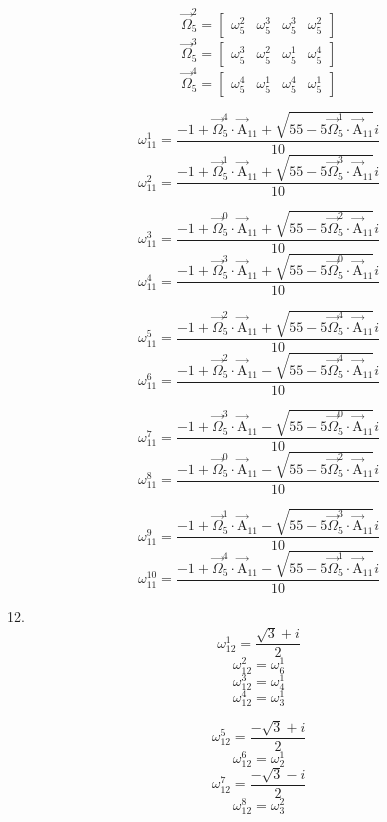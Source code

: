 \documentclass{article}
\begin{document}
\[ \vec{\Omega}_{5}^{2}=\left[ \begin{matrix} \omega_{5}^{2} & \omega_{5}^{3} & \omega_{5}^{3} & \omega_{5}^{2} \end{matrix} \right] \]
\[ \vec{\Omega}_{5}^{3}=\left[ \begin{matrix} \omega_{5}^{3} & \omega_{5}^{2} & \omega_{5}^{1} & \omega_{5}^{4} \end{matrix} \right] \]
\[ \vec{\Omega}_{5}^{4}=\left[ \begin{matrix} \omega_{5}^{4} & \omega_{5}^{1} & \omega_{5}^{4} & \omega_{5}^{1} \end{matrix} \right] \]

\[ \omega_{11}^{1}=\frac{-1+\vec{\Omega}_{5}^{4}\cdot\vec{\mathrm{A}}_{11}+\sqrt{55-5\vec{\Omega}_{5}^{1}\cdot\vec{\mathrm{A}}_{11}}i}{10} \]
\[ \omega_{11}^{2}=\frac{-1+\vec{\Omega}_{5}^{1}\cdot\vec{\mathrm{A}}_{11}+\sqrt{55-5\vec{\Omega}_{5}^{3}\cdot\vec{\mathrm{A}}_{11}}i}{10} \]

\[ \omega_{11}^{3}=\frac{-1+\vec{\Omega}_{5}^{0}\cdot\vec{\mathrm{A}}_{11}+\sqrt{55-5\vec{\Omega}_{5}^{2}\cdot\vec{\mathrm{A}}_{11}}i}{10} \]
\[ \omega_{11}^{4}=\frac{-1+\vec{\Omega}_{5}^{3}\cdot\vec{\mathrm{A}}_{11}+\sqrt{55-5\vec{\Omega}_{5}^{0}\cdot\vec{\mathrm{A}}_{11}}i}{10} \]

\[ \omega_{11}^{5}=\frac{-1+\vec{\Omega}_{5}^{2}\cdot\vec{\mathrm{A}}_{11}+\sqrt{55-5\vec{\Omega}_{5}^{4}\cdot\vec{\mathrm{A}}_{11}}i}{10} \]
\[ \omega_{11}^{6}=\frac{-1+\vec{\Omega}_{5}^{2}\cdot\vec{\mathrm{A}}_{11}-\sqrt{55-5\vec{\Omega}_{5}^{4}\cdot\vec{\mathrm{A}}_{11}}i}{10} \]

\[ \omega_{11}^{7}=\frac{-1+\vec{\Omega}_{5}^{3}\cdot\vec{\mathrm{A}}_{11}-\sqrt{55-5\vec{\Omega}_{5}^{0}\cdot\vec{\mathrm{A}}_{11}}i}{10} \]
\[ \omega_{11}^{8}=\frac{-1+\vec{\Omega}_{5}^{0}\cdot\vec{\mathrm{A}}_{11}-\sqrt{55-5\vec{\Omega}_{5}^{2}\cdot\vec{\mathrm{A}}_{11}}i}{10} \]

\[ \omega_{11}^{9}=\frac{-1+\vec{\Omega}_{5}^{1}\cdot\vec{\mathrm{A}}_{11}-\sqrt{55-5\vec{\Omega}_{5}^{3}\cdot\vec{\mathrm{A}}_{11}}i}{10} \]
\[ \omega_{11}^{10}=\frac{-1+\vec{\Omega}_{5}^{4}\cdot\vec{\mathrm{A}}_{11}-\sqrt{55-5\vec{\Omega}_{5}^{1}\cdot\vec{\mathrm{A}}_{11}}i}{10} \]

12.
\[ \omega_{12}^{1}=\frac{\sqrt{3}+i}{2} \]
\[ \omega_{12}^{2}=\omega_{6}^{1} \]
\[ \omega_{12}^{3}=\omega_{4}^{1} \]
\[ \omega_{12}^{4}=\omega_{3}^{1} \]

\[ \omega_{12}^{5}=\frac{-\sqrt{3}+i}{2} \]
\[ \omega_{12}^{6}=\omega_{2}^{1} \]
\[ \omega_{12}^{7}=\frac{-\sqrt{3}-i}{2} \]
\[ \omega_{12}^{8}=\omega_{3}^{2} \]
\end{document}
